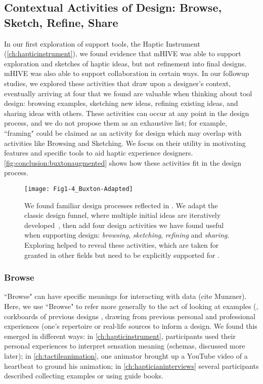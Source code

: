 \subsection{Contextual Activities of Design: Browse, Sketch, Refine, Share}
In our first exploration of \haxd support tools, the Haptic Instrument (\autoref{ch:hapticinstrument}), we found evidence that mHIVE was able to support exploration and sketches of haptic ideas, but not refinement into final designs.
mHIVE was also able to support collaboration in certain ways.
In our followup studies, we explored these activities that draw upon a designer's context, eventually arriving at four that we found are valuable when thinking about tool design: browsing examples, sketching new ideas, refining existing ideas, and sharing ideas with others.
These activities can occur at any point in the design process, and we do not propose them as an exhaustive list; for example, ``framing" \cite{Schon1982,Warr2005} could be claimed as an activity for design which may overlap with activities like Browsing and Sketching.
We focus on their utility in motivating features and specific tools to aid haptic experience designers.
\autoref{fig:conclusion:buxtonaugmented} shows how these activities fit in the design process.


\begin{figure}[htbp] %
   \centering
   \texttt{[image: Fig1-4\_Buxton-Adapted]} 
   \caption{We found familiar design processes reflected in \haxd. We adapt the classic design funnel, where multiple initial ideas are iteratively developed~\cite{Buxton2007}, then add four design activities we have found useful when supporting design: \textit{browsing}, \textit{sketching}, \textit{refining} and \textit{sharing}. Exploring \haxd helped to reveal these activities, which are taken for granted in other fields but need to be explicitly supported for \haxd.}
   \label{fig:conclusion:buxtonaugmented}
\end{figure}


%
%
\subsubsection{Browse} 
``Browse" can have specific meanings for interacting with data (cite Munzner).
Here, we use ``Browse" to refer more generally to the act of looking at examples (\eg, corkboards of previous designs \cite{Buxton2007}, drawing from previous personal and professional experiences (\eg one's repertoire \cite{Schon1982} or real-life sources to inform a design.
We found this emerged in different ways:
in \autoref{ch:hapticinstrument}, participants used their personal experiences to interpret sensation meaning (\ie schemas, discussed more later);
in \autoref{ch:tactileanimation}, one animator brought up a YouTube video of a heartbeat to ground his animation;
in \autoref{ch:hapticianinterviews} several participants described collecting examples or using guide books.

